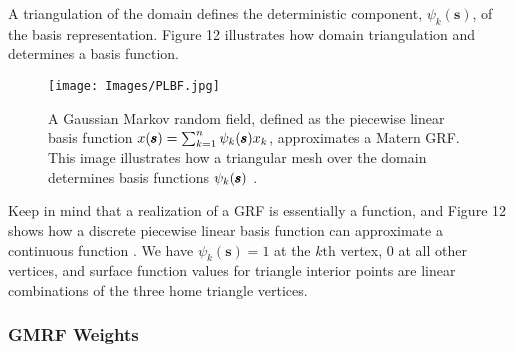 A triangulation of the domain defines the deterministic component, $\psi_{k}(\pmb{s})$, of the basis representation. Figure 12 \citep{Simpson2012} illustrates how domain triangulation and determines a basis function.

  \begin{figure}[H]
	\centering 
	\texttt{[image: Images/PLBF.jpg]}
	\caption{A Gaussian Markov random field, defined as the piecewise linear basis function $  x(\pmb{s}) = \sum_{k=1}^{n} \protect\psi_{k}(\pmb{s})x_{k}$, approximates a Matern GRF. This image illustrates how a triangular mesh over the domain determines basis functions $\protect\psi_{k}(\pmb{s})$ 
	\citep{Simpson2012}.}
	\end{figure}
	
Keep in mind that a realization of a GRF is essentially a function, and Figure 12 shows how a discrete piecewise linear basis function can approximate a continuous function \citep{Simpson2012}. We have $\psi_{k}(\pmb{s}) = 1$ at the $k\text{th}$ vertex, $0$ at all other vertices, and surface function values for triangle interior points are linear combinations of the three home triangle vertices.

\subsubsection*{GMRF Weights}

